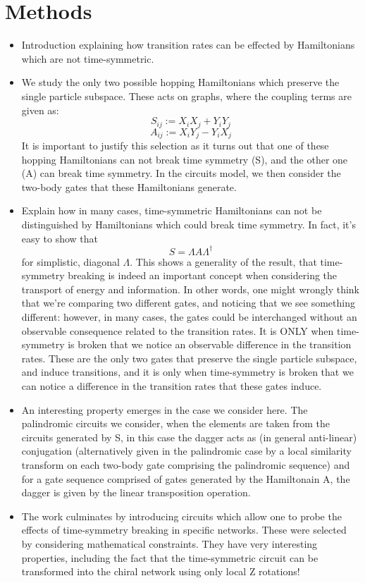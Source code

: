 \documentclass[aps,pra,12pt,nofootinbib,superscriptaddress,longbibliography,showpacs]{revtex4-1}
\theoremstyle{plain}
\theoremstyle{definition}
\begin{document}
\section{Methods} 
\begin{itemize} 
\item Introduction explaining how transition rates can be effected by Hamiltonians which are not time-symmetric. 
\item We study the only two possible hopping Hamiltonians which preserve the single particle subspace.  These acts on graphs, where the coupling terms are given as: 
$$ 
S_{ij} := X_iX_j + Y_iY_j 
$$ 
$$ 
A_{ij} := X_iY_j - Y_iX_j 
$$ 
It is important to justify this selection as it turns out that one of these hopping Hamiltonians can not break time symmetry (S), and the other one (A) can break time symmetry.  In the circuits model, we then consider the two-body gates that these Hamiltonians generate. 
\item Explain how in many cases, time-symmetric Hamiltonians can not be distinguished by Hamiltonians which could break time symmetry.  In fact, it's easy to show that 
$$ 
S = \Lambda A \Lambda^\dagger 
$$ 
for simplistic, diagonal $\Lambda$.  This shows a generality of the result, that time-symmetry breaking is indeed an important concept when considering the transport of energy and information.  In other words, one might wrongly think that we're comparing two different gates, and noticing that we see something different: however, in many cases, the gates could be interchanged without an observable consequence related to the transition rates.  It is ONLY when time-symmetry is broken that we notice an observable difference in the transition rates. These are the only two gates that preserve the single particle subspace, and induce transitions, and it is only when time-symmetry is broken that we can notice a difference in the transition rates that these gates induce.  

\item An interesting property emerges in the case we consider here.  The palindromic circuits we consider, when the elements are taken from the circuits generated by S, in this case the dagger acts as (in general anti-linear) conjugation (alternatively given in the palindromic case by a local similarity transform on each two-body gate comprising the palindromic sequence) and for a gate sequence comprised of gates generated by the Hamiltonain A, the dagger is given by the linear transposition operation.  

\item The work culminates by introducing circuits which allow one to probe the effects of time-symmetry breaking in specific networks.  These were selected by considering mathematical constraints.  They have very interesting properties, including the fact that the time-symmetric circuit can be transformed into the chiral network using only local Z rotations!  


\end{itemize}
\end{document}
